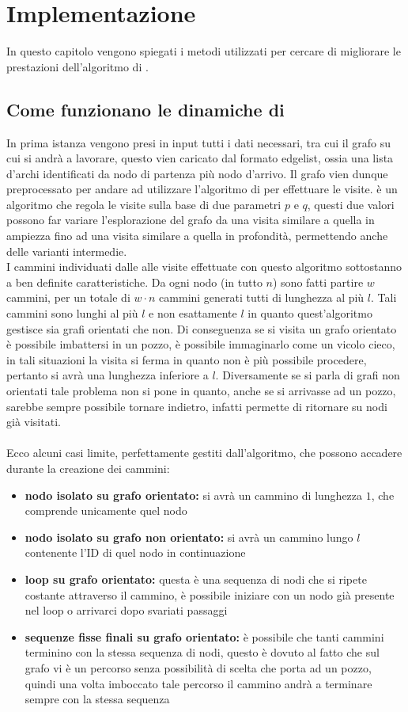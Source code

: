 %
%
%
\chapter{Implementazione}
In questo capitolo vengono spiegati i metodi utilizzati per cercare di migliorare le prestazioni dell'algoritmo di \cnrl \cite{CNRL_code}.
%
\section{Come funzionano le dinamiche di \cnrl}
In prima istanza vengono presi in input tutti i dati necessari, tra cui il grafo su cui si andrà a lavorare, questo vien caricato dal formato edgelist, ossia una lista d'archi identificati da nodo di partenza più nodo d'arrivo. Il grafo vien dunque preprocessato per andare ad utilizzare l'algoritmo di \nv per effettuare le visite. \nv è un algoritmo che regola le visite sulla base di due parametri $p$ e $q$, questi due valori possono far variare l'esplorazione del grafo da una visita similare a quella in ampiezza fino ad una visita similare a quella in profondità, permettendo anche delle varianti intermedie.\\
I cammini individuati dalle alle visite effettuate con questo algoritmo sottostanno a ben definite caratteristiche. Da ogni nodo (in tutto $n$) sono fatti partire $w$ cammini, per un totale di $w \cdot n$ cammini generati tutti di lunghezza al più $l$. Tali cammini sono lunghi al più  $l$ e non esattamente $l$ in quanto quest'algoritmo gestisce sia grafi orientati che non. Di conseguenza se si visita un grafo orientato è possibile imbattersi in un pozzo, è possibile immaginarlo come un vicolo cieco, in tali situazioni la visita si ferma in quanto non è più possibile procedere, pertanto si avrà una lunghezza inferiore a $l$. Diversamente se si parla di grafi non orientati tale problema non si pone in quanto, anche se si arrivasse ad un pozzo, sarebbe sempre possibile tornare indietro, infatti \nv permette di ritornare su nodi già visitati.\\
\\
Ecco alcuni casi limite, perfettamente gestiti dall'algoritmo, che possono accadere durante la creazione dei cammini:
\begin{itemize}
	\item \textbf{nodo isolato su grafo orientato:} si avrà un cammino di lunghezza $1$, che comprende unicamente quel nodo
	\item \textbf{nodo isolato su grafo non orientato:} si avrà un cammino lungo $l$ contenente l'ID di quel nodo in continuazione
	\item \textbf{loop su grafo orientato:} questa è una sequenza di nodi che si ripete costante attraverso il cammino, è possibile iniziare con un nodo già presente nel loop o arrivarci dopo svariati passaggi
	\item \textbf{sequenze fisse finali su grafo orientato:} è possibile che tanti cammini terminino con la stessa sequenza di nodi, questo è dovuto al fatto che sul grafo vi è un percorso senza possibilità di scelta che porta ad un pozzo, quindi una volta imboccato tale percorso il cammino andrà a terminare sempre con la stessa sequenza
\end{itemize}
